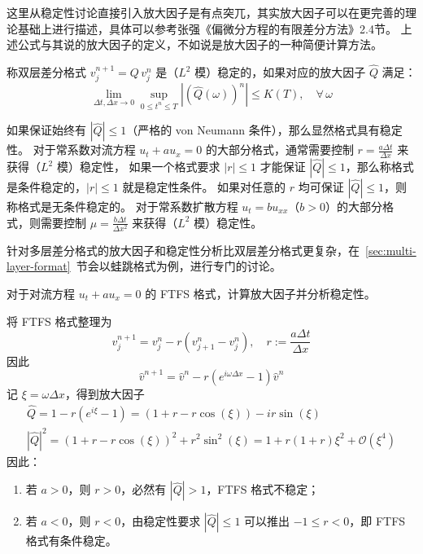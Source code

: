 \begin{remark}
    这里从稳定性讨论直接引入放大因子是有点突兀，其实放大因子可以在更完善的理论基础上进行描述，具体可以参考张强《偏微分方程的有限差分方法》2.4节。
    上述公式与其说的放大因子的定义，不如说是放大因子的一种简便计算方法。
\end{remark}

\begin{definition}
    称双层差分格式 $v_j^{n+1} = Q\,v_j^n$ 是（$L^2$ 模）稳定的，如果对应的放大因子 $\widehat{Q}$ 满足：
    \[
        \lim_{\Delta t, \Delta x \to 0} \sup_{0 \le t^n \le T} |(\widehat{Q}(\omega ))^n| \le K(T), \quad \forall\,\omega
    \]
\end{definition}

如果保证始终有 $|\widehat{Q}| \le 1$（严格的 von Neumann 条件），那么显然格式具有稳定性。
对于常系数对流方程 $u_t + a u_x = 0$ 的大部分格式，通常需要控制 $r = \frac{a \Delta t}{\Delta x}$ 来获得（$L^2$ 模）稳定性，
如果一个格式要求 $|r| \le 1$ 才能保证 $|\widehat{Q}| \le 1$，那么称格式是条件稳定的，$|r| \le 1$ 就是稳定性条件。
如果对任意的 $r$ 均可保证 $|\widehat{Q}| \le 1$，则称格式是无条件稳定的。
对于常系数扩散方程 $u_t = b u_{xx}$（$b > 0$）的大部分格式，则需要控制 $\mu = \frac{b \Delta t}{\Delta x^2}$ 来获得（$L^2$ 模）稳定性。

\begin{remark}
    针对多层差分格式的放大因子和稳定性分析比双层差分格式更复杂，在~\ref{sec:multi-layer-format}~节会以蛙跳格式为例，进行专门的讨论。
\end{remark}

\begin{example}\label{eg:ftfs}
    对于对流方程 $u_t + a u_x = 0$ 的 FTFS 格式，计算放大因子并分析稳定性。
\end{example}

\begin{solution*}
    将 FTFS 格式整理为
    \[
        v_j^{n+1} = v_j^n - r \left( v_{j+1}^n - v_{j}^n \right), \quad r := \frac{a \Delta t}{\Delta x}
    \]
    因此
    \[
        \hat{v}^{n+1} = \hat{v}^n - r (e^{i \omega \Delta x} - 1) \hat{v}^n
    \]
    记 $\xi = \omega \Delta x$，得到放大因子
    \begin{gather*}
        \widehat{Q} ={}   1 - r (e^{i \xi} - 1)  = (1 + r - r \cos(\xi)) - i r \sin(\xi)     \\
        |\widehat{Q}|^2 ={} (1 + r - r \cos(\xi))^2 + r^2 \sin^2(\xi) = 1 + r(1+r) \xi^2 + \mathcal{O}(\xi^4)
    \end{gather*}
    因此：
    \begin{enumerate}
        \item 若 $a > 0$，则 $r > 0$，必然有 $|\widehat{Q}| > 1$，FTFS 格式不稳定；
        \item 若 $a < 0$，则 $r < 0$，由稳定性要求 $|\widehat{Q}| \le 1$ 可以推出 $-1 \le r < 0$，即 FTFS 格式有条件稳定。
    \end{enumerate}
\end{solution*}

